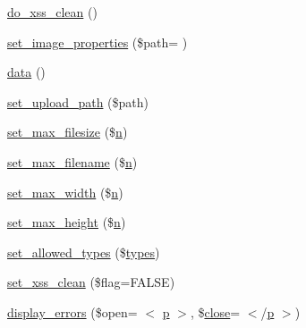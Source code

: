 \begin{DoxyCompactItemize}
\item 
\hyperlink{class_c_i___upload_ae7e5f9b6d774795da126647f10c3c2a6}{do\+\_\+xss\+\_\+clean} ()
\item 
\hyperlink{class_c_i___upload_a5a85ab4c11b130ebc33ba1f07baac1fe}{set\+\_\+image\+\_\+properties} (\$path= \textquotesingle{}\textquotesingle{})
\item 
\hyperlink{class_c_i___upload_a742e8fae78fd74219638525de1271605}{data} ()
\item 
\hyperlink{class_c_i___upload_ab2407f3a942d9b203f54e21194cf040d}{set\+\_\+upload\+\_\+path} (\$path)
\item 
\hyperlink{class_c_i___upload_a1f78c3a54f32d313294b27cde4eafaf4}{set\+\_\+max\+\_\+filesize} (\$\hyperlink{fullpage_2plugin_8min_8js_ab767a859d1217315f42c9bb52fc648dc}{n})
\item 
\hyperlink{class_c_i___upload_aa288c7337b534788b32d66b23e25548e}{set\+\_\+max\+\_\+filename} (\$\hyperlink{fullpage_2plugin_8min_8js_ab767a859d1217315f42c9bb52fc648dc}{n})
\item 
\hyperlink{class_c_i___upload_a4028f187a825a666976cc3fe47cd44a8}{set\+\_\+max\+\_\+width} (\$\hyperlink{fullpage_2plugin_8min_8js_ab767a859d1217315f42c9bb52fc648dc}{n})
\item 
\hyperlink{class_c_i___upload_aaed82d431f5aeee6a0af294bc604a51e}{set\+\_\+max\+\_\+height} (\$\hyperlink{fullpage_2plugin_8min_8js_ab767a859d1217315f42c9bb52fc648dc}{n})
\item 
\hyperlink{class_c_i___upload_a7c7ddfefedddc3fd625dd816d67c21bf}{set\+\_\+allowed\+\_\+types} (\$\hyperlink{_chart_8_core_8js_a0ecd014dd4c5d61d8130961daf1eed54}{types})
\item 
\hyperlink{class_c_i___upload_a5556024223414507d84d221862919212}{set\+\_\+xss\+\_\+clean} (\$flag=F\+A\+L\+SE)
\item 
\hyperlink{class_c_i___upload_a3ed4aa1a4d480c82bb1b663efd466aee}{display\+\_\+errors} (\$open= \textquotesingle{}$<$ \hyperlink{jquery-ui_8min_8js_ad1707b001240e9c8298830073364c8bf}{p} $>$\textquotesingle{}, \$\hyperlink{bootstrap_8min_8js_afaca3a961d693f40135a872e93e71198}{close}= \textquotesingle{}$<$/\hyperlink{jquery-ui_8min_8js_ad1707b001240e9c8298830073364c8bf}{p} $>$\textquotesingle{})
\end{DoxyCompactItemize}

